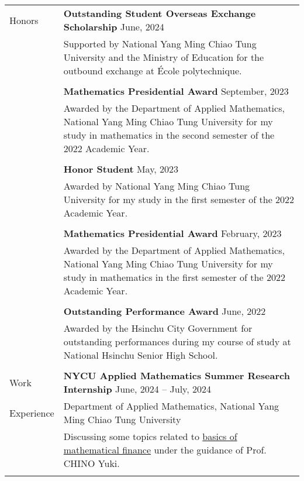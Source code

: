 \documentclass[letterpaper, 11pt]{article}
\begin{document}
\begin{center}
\begin{longtable}{p{0.76in}p{5.93in}}
        {\textcolor{OliveGreen}{Honors}} & \textbf{Outstanding Student Overseas Exchange Scholarship} \hfill June, 2024\\
        & Supported by National Yang Ming Chiao Tung University and the Ministry of Education for the outbound exchange at \'Ecole polytechnique. \\
        & \\
        & \textbf{Mathematics Presidential Award} \hfill September, 2023\\
        & Awarded by the Department of Applied Mathematics, National Yang Ming Chiao Tung University for my study in mathematics in the second semester of the 2022 Academic Year.\\
        & \\
        & \textbf{Honor Student} \hfill May, 2023\\
        & Awarded by National Yang Ming Chiao Tung University for my study in the first semester of the 2022 Academic Year. \\
        & \\
        & \textbf{Mathematics Presidential Award} \hfill February, 2023\\
        & Awarded by the Department of Applied Mathematics, National Yang Ming Chiao Tung University for my study in mathematics in the first semester of the 2022 Academic Year.\\
        & \\
        & \textbf{Outstanding Performance Award} \hfill June, 2022\\
        & Awarded by the Hsinchu City Government for outstanding performances during my course of study at National Hsinchu Senior High School.\\
        & \\
        
        
        {\textcolor{OliveGreen}{Work}} & \textbf{NYCU Applied Mathematics Summer Research Internship} \hfill June, 2024 -- July, 2024 \\
        {\textcolor{OliveGreen}{Experience}} & Department of Applied Mathematics, National Yang Ming Chiao Tung University \\
        & Discussing some topics related to \href{https://hackmd.io/@eiken-sc11/B1QcaW3B0}{basics of mathematical finance} under the guidance of Prof. CHINO Yuki.\\
        & \\
        

\end{longtable}
\end{center}
\end{document}
